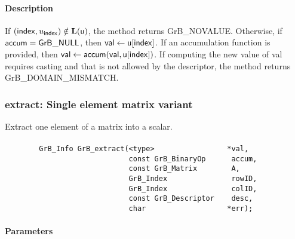 \paragraph{Description}

If $({\sf index},u_{\sf index}) \notin \bold{L}({\sf u})$, the method returns {\sf GrB\_NOVALUE}.
Otherwise, if ${\sf accum} = {\sf GrB\_NULL}$, then ${\sf val} \leftarrow {\sf u}[{\sf index}]$.
If an accumulation function is provided, then ${\sf val} \leftarrow {\sf accum}({\sf val},{\sf u}[{\sf index}])$.
If computing the new value of {\sf val} requires casting and that is not allowed by the descriptor,
the method returns {\sf GrB\_DOMAIN\_MISMATCH}.


\subsubsection{{\sf extract}: Single element matrix variant}
\label{Sec:extract_single_element_mat}


Extract one element of a matrix into a scalar. 

\paragraph{\syntax}

\begin{verbatim}
        GrB_Info GrB_extract(<type>                 *val,
                             const GrB_BinaryOp      accum,
                             const GrB_Matrix        A,
                             GrB_Index               rowID,
                             GrB_Index               colID,
                             const GrB_Descriptor    desc,
                             char                   *err); 

\end{verbatim}

\paragraph{Parameters}


